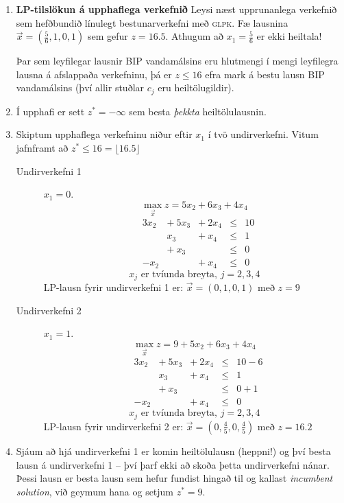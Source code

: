 \begin{lausnSYND}\hspace{.1cm}
\begin{enumerate}
  \item {\bf LP-tilslökun á upphaflega verkefnið} Leysi næst upprunanlega verkefnið sem hefðbundið línulegt bestunarverkefni með \textsc{glpk}. Fæ lausnina $\vec{x}=(\frac{5}{6},1,0,1)$ sem gefur $z=16.5$. Athugum að $x_1=\frac{5}{6}$ er ekki heiltala!
  
  Þar sem leyfilegar lausnir BIP vandamálsins eru hlutmengi í mengi leyfilegra lausna á afslappaða verkefninu, þá er $z \le 16$ efra mark á bestu lausn BIP vandamálsins (því allir stuðlar $c_j$ eru heiltölugildir).

  \item Í upphafi er sett $z^*=-\infty$ sem besta \emph{þekkta} heiltölulausnin.
  \item Skiptum upphaflega verkefninu niður eftir $x_1$ í tvö undirverkefni. Vitum jafnframt að $z^* \le 16 =\lfloor16.5\rfloor$
  \begin{description}
    \item[Undirverkefni 1] $x_1 = 0$.
$$ \max_{\vec{x}} z =  5  x_2 + 6 x_3 + 4 x_4$$
\[\begin{array}{rrrrcl}
      & 3 x_2 &+ ~5 x_3 &+~ 2 x_4 & \le & 10 \\
      &        &    x_3 &+ ~  x_4 & \le & 1 \\
      &        &+  ~ x_3 &        & \le & 0 \\
      &   -x_2 &        &  +~ x_4 & \le & 0
\end{array}\]
$$ x_j \mbox{ er tvíunda breyta, $j=2,3,4$}$$
LP-lausn fyrir undirverkefni 1 er: $\vec{x}=(0,1,0,1)$ með $z=9$
    \item[Undirverkefni 2] $x_1 = 1$.
$$ \max_{\vec{x}} z = 9+ 5  x_2 + 6 x_3 + 4 x_4$$
\[\begin{array}{rrrrcl}
      & 3 x_2 &+~ 5 x_3 &+~ 2 x_4 & \le & 10-6 \\
      &        &    x_3 &+~   x_4 & \le & 1 \\
      &        &+~   x_3 &        & \le & 0+1 \\
      &   -x_2 &        &  +~ x_4 & \le & 0
\end{array}\]
$$ x_j \mbox{ er tvíunda breyta, $j=2,3,4$}$$
LP-lausn fyrir undirverkefni 2 er: $\vec{x}=(0,\frac{4}{5},0,\frac{4}{5})$ með $z=16.2$
  \end{description}

\item Sjáum að hjá undirverkefni 1 er komin heiltölulausn (heppni!) og því besta lausn á undirverkefni 1 -- því þarf ekki að skoða þetta undirverkefni nánar. Þessi lausn er besta lausn sem hefur fundist hingað til og kallast \emph{incumbent solution}, við geymum hana og setjum $z^*=9$.


\end{enumerate}
\end{lausnSYND}
